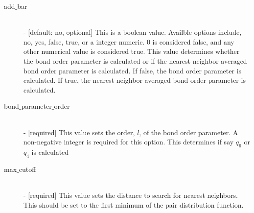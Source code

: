\documentclass{article}
\begin{document}
\begin{description}
	\item[add$\_$bar] \hfill \\
	- [default: no, optional] This is a boolean value.  Availble options include, no, yes, false, true, or a integer numeric.  0 is considered false, and any other numerical value is considered true.  This value determines whether the bond order parameter is calculated or if the nearest neighbor averaged bond order parameter is calculated.  If false, the bond order parameter is calculated.  If true, the nearest neighbor averaged bond order parameter is calculated.
	
	\item[bond$\_$parameter$\_$order] \hfill \\
	- [required] This value sets the order, $l$, of the bond order parameter.  A non-negative integer is required for this option.  This determines if say $q_6$ or $q_4$ is calculated
	
	\item[max$\_$cutoff] \hfill \\
	- [required] This value sets the distance to search for nearest neighbors.  This should be set to the first minimum of the pair distribution function.	
	
\end{description}
\end{document}
